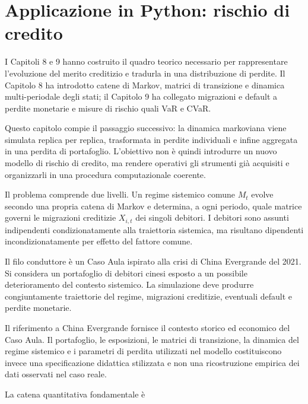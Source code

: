 



\chapter
{Applicazione in Python: rischio di credito}


\label{cap:python-rischio-credito}

I Capitoli 8 e 9 hanno costruito il quadro teorico necessario per
rappresentare l'evoluzione del merito creditizio e tradurla in una
distribuzione di perdite. Il Capitolo 8 ha introdotto catene di Markov,
matrici di transizione e dinamica multi-periodale degli stati; il Capitolo 9
ha collegato migrazioni e default a perdite monetarie e misure di rischio
quali VaR e CVaR.

Questo capitolo compie il passaggio successivo: la dinamica markoviana viene
simulata replica per replica, trasformata in perdite individuali e infine
aggregata in una perdita di portafoglio. L'obiettivo non \`e quindi
introdurre un nuovo modello di rischio di credito, ma rendere operativi gli
strumenti gi\`a acquisiti e organizzarli in una procedura computazionale
coerente.

Il problema comprende due livelli. Un regime sistemico comune $M_t$ evolve
secondo una propria catena di Markov e determina, a ogni periodo, quale
matrice governi le migrazioni creditizie $X_{i,t}$ dei singoli debitori. I
debitori sono assunti indipendenti condizionatamente alla traiettoria
sistemica, ma risultano dipendenti incondizionatamente per effetto del
fattore comune.

Il filo conduttore \`e un Caso Aula ispirato alla crisi di China Evergrande
del 2021. Si considera un portafoglio di debitori cinesi esposto a un
possibile deterioramento del contesto sistemico. La simulazione deve produrre
congiuntamente traiettorie del regime, migrazioni creditizie, eventuali
default e perdite monetarie.

Il riferimento a China Evergrande fornisce il contesto storico ed economico
del Caso Aula. Il portafoglio, le esposizioni, le matrici di transizione,
la dinamica del regime sistemico e i parametri di perdita utilizzati nel
modello costituiscono invece una specificazione didattica stilizzata e non
una ricostruzione empirica dei dati osservati nel caso reale.

La catena quantitativa fondamentale \`e

